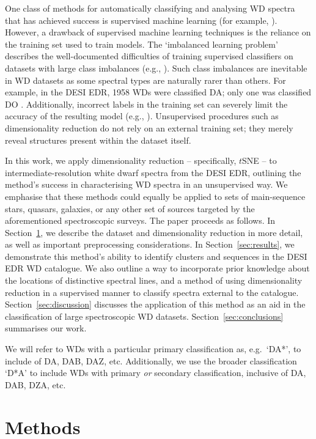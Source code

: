 \documentclass[fleqn,usenatbib]{mnras}
\begin{document}
One class of methods for automatically classifying and analysing WD spectra that has achieved success is supervised machine learning (for example, \citealt{yang20, tan23, garciazamora23, vincent23, vincent24}).
However, a drawback of supervised machine learning techniques is the reliance on the training set used to train models.
The `imbalanced learning problem' describes the well-documented difficulties of training supervised classifiers on datasets with large class imbalances (e.g., \citealt{he09, johnson19}).
Such class imbalances are inevitable in WD datasets as some spectral types are naturally rarer than others.
For example, in the DESI EDR, 1958 WDs were classified DA; only one was classified DO \citep{manser24}.
Additionally, incorrect labels in the training set can severely limit the accuracy of the resulting model (e.g., \citealt{frenay14}).
Unsupervised procedures such as dimensionality reduction do not rely on an external training set; they merely reveal structures present within the dataset itself.

In this work, we apply dimensionality reduction -- specifically, $t$SNE -- to intermediate-resolution white dwarf spectra from the DESI EDR, outlining the method's success in characterising WD spectra in an unsupervised way.
We emphasise that these methods could equally be applied to sets of main-sequence stars, quasars, galaxies, or any other set of sources targeted by the aforementioned spectroscopic surveys.
The paper proceeds as follows.
In Section~\ref{sec:methods}, we describe the dataset and dimensionality reduction in more detail, as well as important preprocessing considerations.
In Section~\ref{sec:results}, we demonstrate this method's ability to identify clusters and sequences in the DESI EDR WD catalogue.
We also outline a way to incorporate prior knowledge about the locations of distinctive spectral lines, and a method of using dimensionality reduction in a supervised manner to classify spectra external to the catalogue.
Section~\ref{sec:discussion} discusses the application of this method as an aid in the classification of large spectroscopic WD datasets.
Section~\ref{sec:conclusions} summarises our work.

We will refer to WDs with a particular primary classification as, e.g.\ `DA*', to include of DA, DAB, DAZ, etc.
Additionally, we use the broader classification `D*A' to include WDs with primary \textit{or} secondary classification, inclusive of DA, DAB, DZA, etc.

\section{Methods}
\label{sec:methods}
\end{document}
